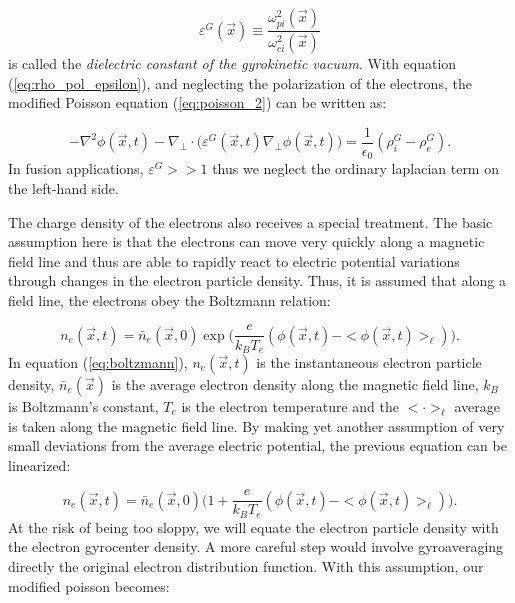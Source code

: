 \documentclass[]{report}   %
\begin{document}
\begin{equation}
\varepsilon^G(\vec{x}) \equiv \frac{\omega^2_{pi}(\vec{x})}{\omega^2_{ci}(\vec{x})}
\end{equation}
is called the \emph{dielectric constant of the gyrokinetic vacuum}. With equation (\ref{eq:rho_pol_epsilon}), and neglecting the polarization of the electrons, the modified Poisson equation (\ref{eq:poisson_2}) can be written as:

\begin{equation}
-\nabla ^2 \phi(\vec{x},t) - \nabla_{\perp} \cdot \big(\varepsilon ^G(\vec{x},t)\nabla_{\perp} \phi(\vec{x},t) \big) = \frac{1}{\epsilon_0}(\rho^G_i - \rho^G_e).
\end{equation}
In fusion applications, $\varepsilon^G >> 1$ thus we neglect the ordinary laplacian term on the left-hand side. 

The charge density of the electrons also receives a special treatment. The basic assumption here is that the electrons can move very quickly along a magnetic field line and thus are able to rapidly react to electric potential variations through changes in the electron particle density. Thus, it is assumed that along a field line, the electrons obey the Boltzmann relation:

\begin{equation}  \label{eq:boltzmann}
n_e(\vec{x},t) = \bar{n}_e(\vec{x},0) \exp \bigg(\frac{e}{k_BT_e}(\phi(\vec{x},t) - <\phi(\vec{x},t)>_{\ell})\bigg).
\end{equation}
In equation (\ref{eq:boltzmann}), $n_e(\vec{x},t)$ is the instantaneous electron particle density, $\bar{n}_e(\vec{x})$ is the average electron density along the magnetic field line, $k_B$ is Boltzmann's constant, $T_e$ is the electron temperature and the $< \cdot >_{\ell}$ average is taken along the magnetic field line. By making yet another assumption of very small deviations from the average electric potential, the previous equation can be linearized:

\begin{equation}  \label{eq:boltzmann_linear}
n_e(\vec{x},t) = \bar{n}_e(\vec{x},0) \bigg(1+\frac{e}{k_BT_e}(\phi(\vec{x},t) - <\phi(\vec{x},t)>_{\ell})\bigg).
\end{equation}
At the risk of being too sloppy, we will equate the electron particle density with the electron gyrocenter density. A more careful step would involve gyroaveraging directly the original electron distribution function. With this assumption, our modified poisson becomes:
\end{document}
